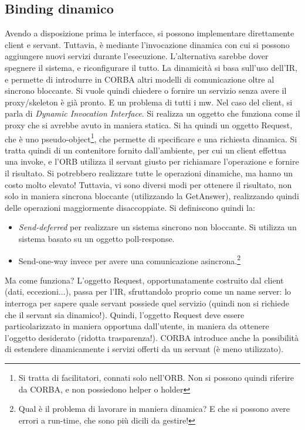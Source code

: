 \subsection{Binding dinamico}
Avendo a disposizione prima le interfacce, si possono implementare direttamente client e servant. Tuttavia, è mediante
l'invocazione dinamica con cui si possono aggiungere nuovi servizi durante l'esecuzione. L'alternativa sarebbe
dover spegnere il sistema, e riconfigurare il tutto. La dinamicità si basa sull'uso dell'IR, e permette di introdurre in
CORBA altri modelli di comunicazione oltre al sincrono bloccante.
Si vuole quindi chiedere o fornire un servizio senza avere il proxy/skeleton è già pronto. E un problema di tutti i mw.
Nel caso del client, si parla di \textit{Dynamic Invocation Interface}. Si realizza un oggetto che funziona come il
proxy che si avrebbe avuto in maniera statica. Si ha quindi un oggetto Request, che è uno pseudo-object\footnote{Si
tratta di facilitatori, connati solo nell'ORB. Non si possono quindi riferire da CORBA,
e non possiedono helper o holder}, che permette di specificare e una richiesta dinamica. Si tratta quindi di un
contenitore fornito dall'ambiente, per cui un client effettua una invoke, e l'ORB utilizza il servant giusto per
richiamare l'operazione e fornire il risultato. Si potrebbero realizzare tutte le operazioni dinamiche, ma hanno un
costo molto elevato! Tuttavia, vi sono diversi modi per ottenere il risultato, non solo in maniera sincrona bloccante
(utilizzando la GetAnswer), realizzando quindi delle operazioni maggiormente disaccoppiate. Si definiscono quindi la:
\begin{itemize}
 \item \textit{Send-deferred} per realizzare un sistema sincrono non bloccante. Si utilizza un sistema basato su un
 oggetto poll-response.
 \item Send-one-way invece per avere una comunicazione asincrona.\footnote{Qual è il problema di lavorare in maniera
 dinamica? E che si possono avere errori a run-time, che sono più dicili da gestire!}
\end{itemize}
Ma come funziona? L'oggetto Request, opportunatamente costruito dal client (dati, eccezioni...), passa per l'IR,
sfruttandolo proprio come un name server: lo interroga per sapere quale servant possiede quel servizio (quindi non si
richiede che il servant sia dinamico!). Quindi, l'oggetto Request deve essere particolarizzato in maniera opportuna
dall'utente, in maniera da ottenere l'oggetto desiderato (ridotta trasparenza!).
CORBA introduce anche la possibilità di estendere dinamicamente i servizi offerti da un servant (è meno utilizzato).
